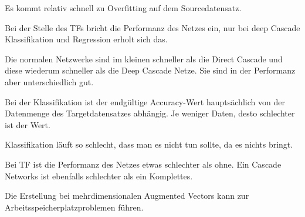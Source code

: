 
Es kommt relativ schnell zu Overfitting auf dem Sourcedatensatz. %

Bei der Stelle des TFs bricht die Performanz des Netzes ein, nur bei deep Cascade Klassifikation und Regression erholt sich das. 


Die normalen Netzwerke sind im kleinen schneller als die Direct Cascade und diese wiederum schneller als die Deep Cascade Netze. 
Sie sind in der Performanz aber unterschiedlich gut. \newline



Bei der Klassifikation ist der endgültige Accuracy-Wert hauptsächlich von der Datenmenge des Targetdatensatzes abhängig. 
Je weniger Daten, desto schlechter ist der Wert. %

Klassifikation läuft so schlecht, dass man es nicht tun sollte, da es nichts bringt. %

Bei TF ist die Performanz des Netzes etwas schlechter als ohne. %
Ein Cascade Networks ist ebenfalls schlechter als ein Komplettes. %


Die Erstellung bei mehrdimensionalen Augmented Vectors kann zur Arbeitsspeicherplatzproblemen führen. %

